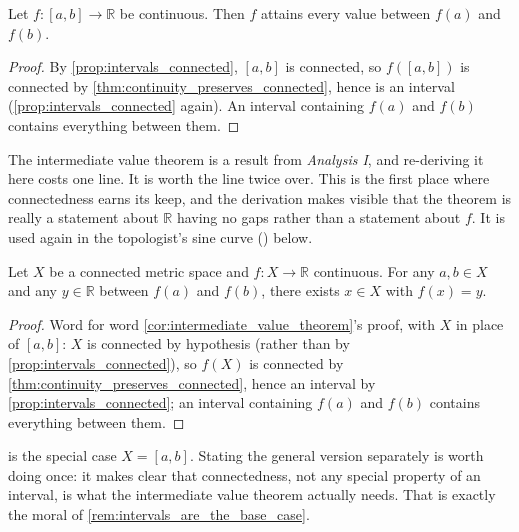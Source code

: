 \begin{corollary}
\label{cor:intermediate_value_theorem}
Let $f : [a,b] \to \mathbb{R}$ be continuous. Then $f$ attains every value between $f(a)$ and
$f(b)$.
\end{corollary}

\begin{proof}
By \cref{prop:intervals_connected}, $[a,b]$ is connected, so $f([a,b])$ is connected by
\cref{thm:continuity_preserves_connected}, hence is an interval (\cref{prop:intervals_connected}
again). An interval containing $f(a)$ and $f(b)$ contains everything between them.
\end{proof}

The intermediate value theorem is a result from \emph{Analysis I}, and re-deriving it here costs
one line. It is worth the line twice over. This is the first place where connectedness earns its
keep, and the derivation makes visible that the theorem is really a statement about $\mathbb{R}$
having no gaps rather than a statement about $f$. It is used again in the topologist's sine curve
() below.

\begin{corollary}
\label{cor:ivt_general_connected}
Let $X$ be a connected metric space and $f : X \to \mathbb{R}$ continuous. For any $a,b \in X$
and any $y \in \mathbb{R}$ between $f(a)$ and $f(b)$, there exists $x \in X$ with $f(x) = y$.
\end{corollary}

\begin{proof}
Word for word \cref{cor:intermediate_value_theorem}'s proof, with $X$ in place of $[a,b]$: $X$
is connected by hypothesis (rather than by \cref{prop:intervals_connected}), so $f(X)$ is
connected by \cref{thm:continuity_preserves_connected}, hence an interval by
\cref{prop:intervals_connected}; an interval containing $f(a)$ and $f(b)$ contains everything
between them.
\end{proof}

\begin{remark}
 is the special case $X = [a,b]$. Stating the general
version separately is worth doing once: it makes clear that connectedness, not any special
property of an interval, is what the intermediate value theorem actually needs. That is exactly
the moral of \cref{rem:intervals_are_the_base_case}.
\end{remark}

